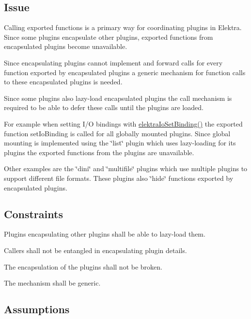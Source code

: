 \subsection*{Issue}

Calling exported functions is a primary way for coordinating plugins in Elektra. Since some plugins encapsulate other plugins, exported functions from encapsulated plugins become unavailable.

Since encapsulating plugins cannot implement and forward calls for every function exported by encapsulated plugins a generic mechanism for function calls to these encapsulated plugins is needed.

Since some plugins also lazy-\/load encapsulated plugins the call mechanism is required to be able to defer these calls until the plugins are loaded.

For example when setting I/O bindings with {\ttfamily \hyperlink{group__kdbio_ga187345483bdfbb404919c6797bc2db77}{elektra\+Io\+Set\+Binding()}} the exported function {\ttfamily set\+Io\+Binding} is called for all globally mounted plugins. Since global mounting is implemented using the \char`\"{}list\char`\"{} plugin which uses lazy-\/loading for its plugins the exported functions from the plugins are unavailable.

Other examples are the \char`\"{}dini\char`\"{} and \char`\"{}multifile\char`\"{} plugins which use multiple plugins to support different file formats. These plugins also \char`\"{}hide\char`\"{} functions exported by encapsulated plugins.

\subsection*{Constraints}


\begin{DoxyEnumerate}
\item Plugins encapsulating other plugins shall be able to lazy-\/load them.
\item Callers shall not be entangled in encapsulating plugin details.
\item The encapsulation of the plugins shall not be broken.
\item The mechanism shall be generic.
\end{DoxyEnumerate}

\subsection*{Assumptions}


